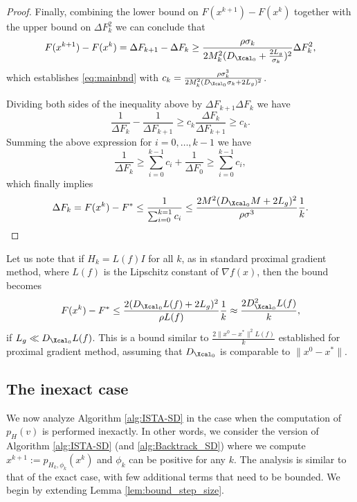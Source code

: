 \documentclass[11pt]{article}
\numberwithin{equation}{section}
\begin{document}
\begin{proof}
	Finally, combining the lower bound on $F(x^{k+1})-F(x^k)$ together with the upper bound on $\Delta F_k^2$  we can conclude that
	\[
	F(x^{k+1})-F(x^k)=\Delta F_{k+1}-\Delta F_k\geq  \frac{\rho\sigma_k}{2M_k^2 (D_{\Xcal_0}+\frac{2L_g}{\sigma_k})^2}\Delta F_k^2,
	\]
	which establishes \eqref{eq:mainbnd} with $c_k= \frac{\rho\sigma_k^3}{2M_k^2 (D_{\Xcal_0}\sigma_k+2L_g)^2}$. 

	Dividing both sides of the inequality above  by $\Delta F_{k+1}\Delta F_k$ we have
	\[
	\frac{1}{\Delta F_{k}}-\frac{1}{\Delta F_{k+1}}\geq c_k\frac{\Delta F_{k}}{\Delta F_{k+1}}\geq c_k.
	\]
	Summing the above expression for  $i=0, \ldots, k-1$ we have
	\[
	\frac{1}{\Delta F_{k}}\geq \sum_{i=0}^{k-1}c_i+\frac{1}{\Delta F_{0}} \geq \sum_{i=0}^{k-1}c_i,
	\]
	which finally implies
	\[
	\Delta F_k=F(x^k)-F^*\leq \frac{1}{\sum_{i=0}^{k=1} c_i} \leq  \frac{2M^2 (D_{\Xcal_0}M+2L_g)^2}{\rho\sigma^3}\frac{1}{k}.
	\]
\end{proof}

Let us note that if $H_k=L(f)I$ for all $k$, as in standard proximal gradient method, where $L(f)$ is the Lipschitz constant of $\nabla f(x)$, then
the bound becomes
\[
F(x^k)-F^*\leq   \frac{ 2(D_{\Xcal_0}L(f)+2L_g)^2}{\rho L(f)}\frac{1}{k}\approx \frac{ 2D_{\Xcal_0}^2L(f)}{k},
\]
if $L_g\ll D_{\Xcal_0}L(f)$. This is a bound similar to $\frac{2\|x^0-x^*\|^2L(f)}{k}$ established for proximal gradient method, assuming that $D_{\Xcal_0}$ is comparable to
$\|x^0-x^*\|$. 


\subsection{The inexact case} %
\label{sec:conv_inexact}

We now  analyze Algorithm \ref{alg:ISTA-SD}  in the case when the computation of $p_H( v)$ is performed inexactly. 
In other words, we consider the version of Algorithm \ref{alg:ISTA-SD} (and \ref{alg:Backtrack_SD}) where we compute 
$x^{k+1}  := p_{H_k, \phi_k}(x^k)$ and $\phi_k$ can be positive for any $k$. The analysis is similar to that of the exact case, with few additional terms that need to be bounded. We begin by extending Lemma \ref{lem:bound_step_size}.
\end{document}
